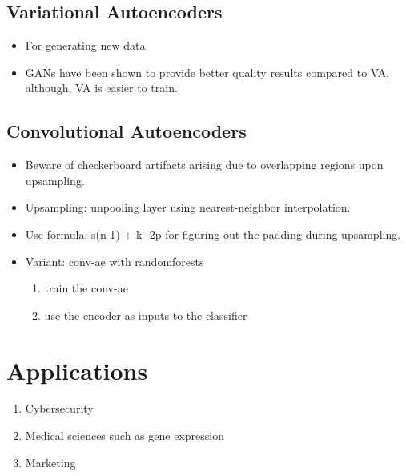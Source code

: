 \documentclass[a4paper, 12pt]{report}
\begin{document}
\section{Variational Autoencoders}
\begin{itemize}
\item For generating new data
\item GANs have been shown to provide better quality results compared to VA, although, VA is easier to train.
\end{itemize}

\section{Convolutional Autoencoders}
\begin{itemize}
\item Beware of checkerboard artifacts arising due to overlapping regions upon upsampling.
\item Upsampling: unpooling layer using nearest-neighbor interpolation.
\item Use formula: s(n-1) + k -2p for figuring out the padding during upsampling.

\item Variant: conv-ae with randomforests
	\begin{enumerate}
	\item train the conv-ae
	\item use the encoder as inputs to the classifier
	\end{enumerate}
\end{itemize}

\chapter{Applications}
\begin{enumerate}
\item Cybersecurity
\item Medical sciences such as gene expression
\item Marketing
\end{enumerate}
\end{document}

